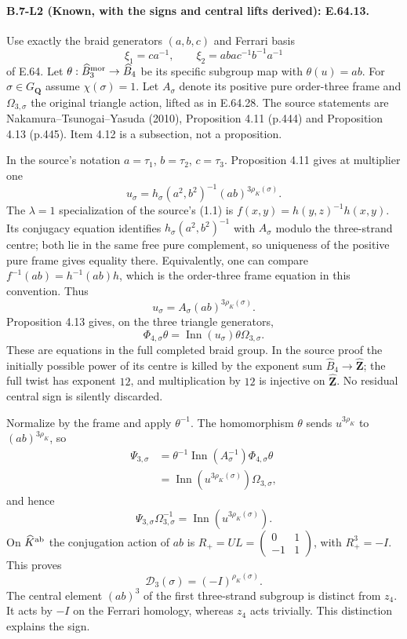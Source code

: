 \paragraph{B.7-L2 (Known, with the signs and central lifts derived): E.64.13.}
Use exactly the braid generators $(a,b,c)$ and Ferrari basis
\[
 \xi_1=ca^{-1},\qquad
 \xi_2=aba c^{-1}b^{-1}a^{-1}
\]
of E.64. Let $\theta:\widehat B_3^{\rm mor}\to\widehat B_4$
be its specific subgroup map with $\theta(u)=ab$. For
$\sigma\in G_{\mathbf Q}$ assume $\chi(\sigma)=1$.
Let $A_\sigma$ denote its positive pure order-three frame and
$\Omega_{3,\sigma}$ the original triangle action, lifted as in
E.64.28. The source statements are Nakamura--Tsunogai--Yasuda
(2010), Proposition 4.11 (p.444) and Proposition 4.13 (p.445).
Item 4.12 is a subsection, not a proposition.

In the source's notation $a=\tau_1$, $b=\tau_2$, $c=\tau_3$.
Proposition 4.11 gives at multiplier one
\[
 u_\sigma=h_\sigma(a^2,b^2)^{-1}(ab)^{3\rho_K(\sigma)}.
\]
The $\lambda=1$ specialization of the source's (1.1) is
$f(x,y)=h(y,z)^{-1}h(x,y)$. Its conjugacy equation identifies
$h_\sigma(a^2,b^2)^{-1}$ with $A_\sigma$ modulo the three-strand
centre; both lie in the same free pure complement, so uniqueness
of the positive pure frame gives equality there. Equivalently,
one can compare $f^{-1}(ab)=h^{-1}(ab)h$, which is the order-three
frame equation in this convention. Thus
\[
 u_\sigma=A_\sigma(ab)^{3\rho_K(\sigma)}.
\]
Proposition 4.13 gives, on the three triangle generators,
\[
 \Phi_{4,\sigma}\theta
       =\operatorname{Inn}(u_\sigma)\theta\Omega_{3,\sigma}.
\]
These are equations in the full completed braid group. In the
source proof the initially possible power of its centre is killed
by the exponent sum $\widehat B_4\to\widehat{\mathbf Z}$; the
full twist has exponent $12$, and multiplication by $12$ is
injective on $\widehat{\mathbf Z}$. No residual central sign
is silently discarded.

Normalize by the frame and apply $\theta^{-1}$. The homomorphism
$\theta$ sends $u^{3\rho_K}$ to $(ab)^{3\rho_K}$, so
\[
 \begin{split}
 \Psi_{3,\sigma}
 &=\theta^{-1}\operatorname{Inn}(A_\sigma^{-1})
                      \Phi_{4,\sigma}\theta\\
 &=\operatorname{Inn}(u^{3\rho_K(\sigma)})\Omega_{3,\sigma},
 \end{split}
\]
and hence
\[
 \Psi_{3,\sigma}\Omega_{3,\sigma}^{-1}
     =\operatorname{Inn}(u^{3\rho_K(\sigma)}).
\]
On $\widehat K^{\rm ab}$ the conjugation action of $ab$ is
$R_+=UL=\left(\begin{smallmatrix}0&1\\-1&1\end{smallmatrix}\right)$,
with $R_+^3=-I$. This proves
\[
 \mathcal D_3(\sigma)=(-I)^{\rho_K(\sigma)}.
\]
The central element $(ab)^3$ of the first three-strand subgroup
is distinct from $z_4$. It acts by $-I$ on the Ferrari homology,
whereas $z_4$ acts trivially. This distinction explains the sign.

